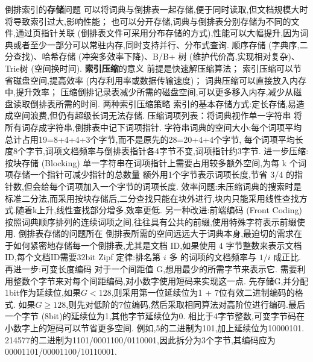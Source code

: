 \documentclass[10pt, utf8]{ctexart}
\begin{document}
\begin{multicols}{4}
    {\color{purple_}倒排索引的\textbf{存储}问题}
    可以将词典与倒排表一起存储,便于同时读取,但文档规模大时将导致索引过大,影响性能；
    也可以分开存储,词典与倒排表分别存储为不同的文件,通过页指针关联 (倒排表文件可采用分布存储的方式),性能可以大幅提升,因为词典或者至少一部分可以常驻内存,同时支持并行、分布式查询.
    顺序存储 (字典序,二分查找)、哈希存储 (冲突多效率下降)、B/B+ 树 (维护代价高,实现相对复杂)、Trie树 (空间换时间).
        {\color{purple_}\textbf{索引压缩}\color{blue}的意义}
    前提是快速解压缩算法；
    索引压缩可以节省磁盘空间,提高效率 (内存利用率或数据传输速度)；
    词典压缩可以直接放入内存中,提升效率；
    压缩倒排记录表减少所需的磁盘空间,可以更多移入内存,减少从磁盘读取倒排表所需的时间.
    {\color{purple_}两种索引压缩策略}
    {\color{blue}索引的基本存储方式}:定长存储,易造成空间浪费,但仍有超级长词无法存储.
    {\color{blue}压缩词项列表：将词典视作单一字符串}
    将所有词存成字符串,倒排表中记下词项指针.
    字符串词典的空间大小:每个词项平均总计占用19=8+4+4+3个字节,而不是原先的28=20+4+4个字节,
    每个词项平均长度8个字节,词项文档频率与倒排表指针各4字节不变,词项指针约3字节.
    {\color{blue}进一步压缩:按块存储 (Blocking)}
    单一字符串在词项指针上需要占用较多额外空间,为每 k 个词项存储一个指针可减少指针的总数量
    额外用1个字节表示词项长度,节省 3/4 的指针数,但会给每个词项加入一个字节的词项长度.
    效率问题:未压缩词典的搜索时是标准二分法,而采用按块存储后,二分查找只能在块外进行,块内只能采用线性查找方式.随着k上升,线性查找部分增多,效率更低.
    {\color{blue}另一种改进:前端编码 (Front Coding)}
    按照词典顺序排列的连续词项之间,往往具有公共的前缀,使用特殊字符表示前缀使用.
    {\color{blue}倒排表存储的问题所在}
    倒排表所需的空间远远大于词典本身,最迫切的需求在于如何紧密地存储每一个倒排表,尤其是文档 ID,如果使用 4 字节整数来表示文档ID,每个文档ID需要32bit
    Zipf 定律:排名第 $i$ 多 的词项的文档频率与 $1/i$ 成正比.
    {\color{red}再进一步:可变长度编码}
    对于一个间距值 G,想用最少的所需字节来表示它.
    需要利用整数个字节来对每个间距编码,对小数字使用短码来实现这一点.
    先存储G,并分配1bit作为延续位,如果$G<128$,则采用第一位延续位为1 + 7位有效二进制编码的格式.
    如果$G\geqslant128$,则先对低阶的7位编码,然后采取相同算法对高阶位进行编码.最后一个字节 (8bit)的延续位为1,其他字节延续位为0.
    相比于4字节整数,可变字节码在小数字上的短码可以节省更多空间.
    例如,5的二进制为101,加上延续位为10000101.
    214577的二进制为1101/0001100/0110001,因此拆分为3个字节,其编码应为00001101/00001100/10110001.


\end{multicols}
\end{document}
